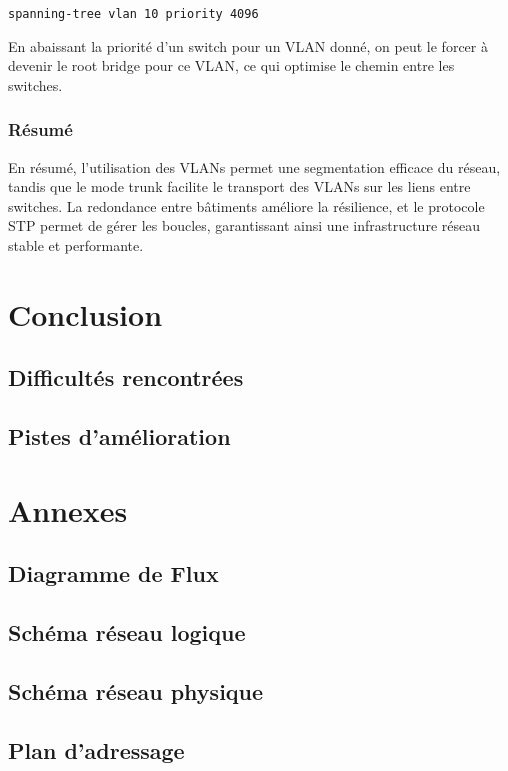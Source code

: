 \documentclass[a4paper,12pt]{report}
\begin{document}
\begin{verbatim}
spanning-tree vlan 10 priority 4096
\end{verbatim}

En abaissant la priorité d'un switch pour un VLAN donné, on peut le forcer à devenir le root bridge pour ce VLAN, ce qui optimise le chemin entre les switches.

\subsection{Résumé}
En résumé, l'utilisation des VLANs permet une segmentation efficace du réseau, tandis que le mode trunk facilite le transport des VLANs sur les liens entre switches. La redondance entre bâtiments améliore la résilience, et le protocole STP permet de gérer les boucles, garantissant ainsi une infrastructure réseau stable et performante.

    \chapter{Conclusion}
        \section{Difficultés rencontrées}
        \section{Pistes d'amélioration}

    \chapter*{Annexes}
        \section{Diagramme de Flux}
        \section{Schéma réseau logique}
        \section{Schéma réseau physique}
        \section{Plan d'adressage}
        
\end{document}
